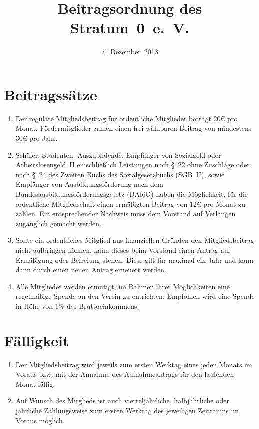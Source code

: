 \documentclass[a4paper,12pt]{scrartcl}
\title{Beitragsordnung des Stratum~0~e.~V.}
\date{7.~Dezember~2013}
\begin{document}
\maketitle

\section{Beitragssätze}
\begin{enumerate}
  \item Der reguläre Mitgliedsbeitrag für ordentliche Mitglieder beträgt 20€
    pro Monat. Fördermitglieder zahlen einen frei wählbaren Beitrag von
    mindestens 30€ pro Jahr.
  \item Schüler, Studenten, Auszubildende, Empfänger von Sozialgeld oder
    Arbeitslosengeld~II einschließlich Leistungen nach §~22 ohne Zuschläge oder
    nach §~24 des Zweiten Buchs des Sozialgesetzbuchs (SGB~II), sowie Empfänger
    von Ausbildungsförderung nach dem Bundesausbildungsförderungsgesetz (BAföG)
    haben die Möglichkeit, für die ordentliche Mitgliedschaft einen ermäßigten
    Beitrag von 12€ pro Monat zu zahlen. Ein entsprechender Nachweis muss dem
    Vorstand auf Verlangen zugänglich gemacht werden.
  \item Sollte ein ordentliches Mitglied aus finanziellen Gründen den
    Mitgliedsbeitrag nicht aufbringen können, kann dieses beim Vorstand einen
    Antrag auf Ermäßigung oder Befreiung stellen. Diese gilt für maximal ein
    Jahr und kann dann durch einen neuen Antrag erneuert werden.
  \item Alle Mitglieder werden ermutigt, im Rahmen ihrer Möglichkeiten eine
    regelmäßige Spende an den Verein zu entrichten. Empfohlen wird eine Spende
    in Höhe von 1\% des Bruttoeinkommens.
\end{enumerate}

\section{Fälligkeit}
\begin{enumerate}
  \item Der Mitgliedsbeitrag wird jeweils zum ersten Werktag eines jeden Monats
    im Voraus bzw. mit der Annahme des Aufnahmeantrags für den laufenden Monat
    fällig.
  \item Auf Wunsch des Mitglieds ist auch vierteljährliche, halbjährliche oder
    jährliche Zahlungsweise zum ersten Werktag des jeweiligen Zeitraums im
    Voraus möglich.
\end{enumerate}
\end{document}
